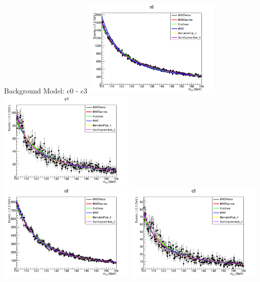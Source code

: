 \documentclass[pdf, 9pt]{beamer}
\begin{document}
  \begin{frame}{Background Model: c0 - c3}
    \includegraphics[width=0.49\textwidth, height=0.45\textheight]{figs/higgs/backgroundmodel/uf_bdt/backgroundFits__c0__bkgModels.png}
    \includegraphics[width=0.49\textwidth, height=0.45\textheight]{figs/higgs/backgroundmodel/uf_bdt/backgroundFits__c1__bkgModels.png}\\
    \includegraphics[width=0.49\textwidth, height=0.45\textheight]{figs/higgs/backgroundmodel/uf_bdt/backgroundFits__c2__bkgModels.png}
    \includegraphics[width=0.49\textwidth, height=0.45\textheight]{figs/higgs/backgroundmodel/uf_bdt/backgroundFits__c3__bkgModels.png}
  \end{frame}
\end{document}

